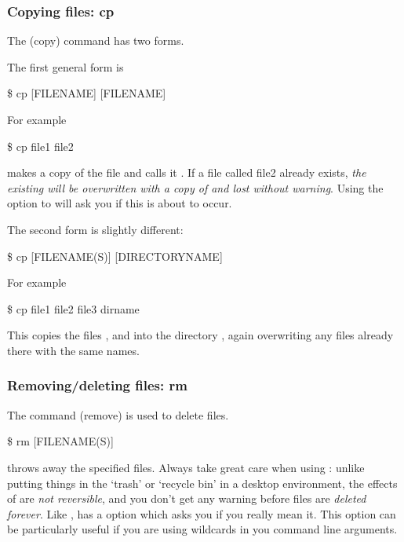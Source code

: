 \subsubsection{Copying files: cp}

\noindent The  (copy) command has two forms.


The first general form is
\begin{ttoutenv}
\$  cp [FILENAME] [FILENAME] \return
\end{ttoutenv}

For example

\begin{ttoutenv}
\$  cp file1 file2 \return
\end{ttoutenv}
%
makes a copy of the file  and calls it .  If
a file called file2 already exists, \emph{the existing  will be  overwritten
with a copy of  and lost without warning}. Using the  option to  will ask you if this is about to occur.

The second form is slightly different:
\begin{ttoutenv}
\$  cp [FILENAME(S)] [DIRECTORYNAME]
\end{ttoutenv}
%
For example

\begin{ttoutenv}
\$  cp file1 file2 file3 dirname \return
\end{ttoutenv}

This copies the files ,  and  into
the directory , again overwriting any files already
there with the same names.

\subsubsection{Removing/deleting files: rm}

The command  (remove) is used to delete files.
\begin{ttoutenv}
\$  rm [FILENAME(S)]
\end{ttoutenv}
%
throws away the specified files. Always take great care when using : unlike putting things in the `trash' or `recycle bin' in a desktop environment, the effects of  are \textit{not reversible}, and you don't get any warning before files are \textit{deleted forever}.  Like ,  has a  option which asks you if you really mean it. This option can be particularly useful if you are using wildcards in you command line arguments.


